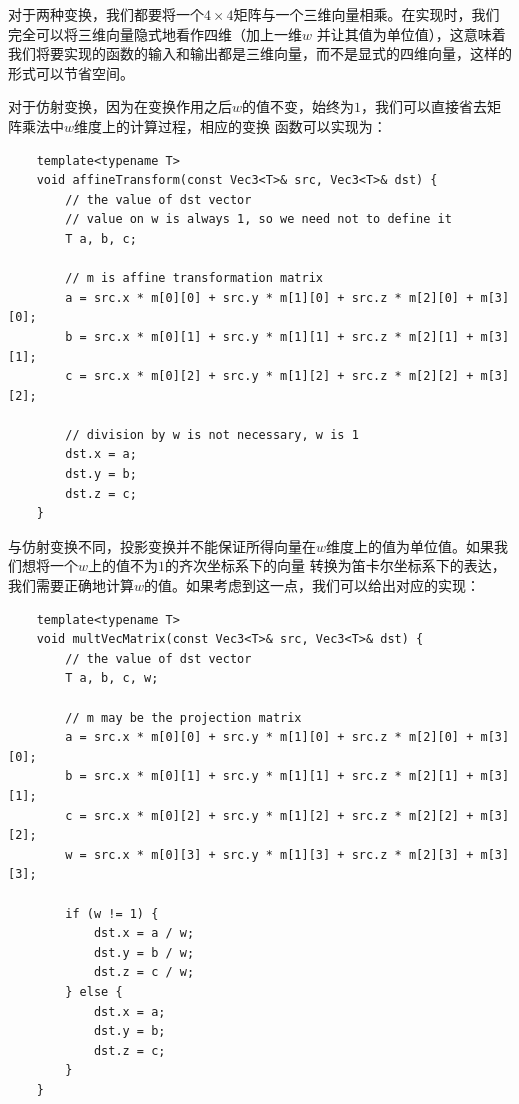\documentclass[12pt]{article}
\begin{document}
\indent{}对于两种变换，我们都要将一个$4\times 4$矩阵与一个三维向量相乘。在实现时，我们完全可以将三维向量隐式地看作四维（加上一维$w$
并让其值为单位值），这意味着我们将要实现的函数的输入和输出都是三维向量，而不是显式的四维向量，这样的形式可以节省空间。

\indent{}对于仿射变换，因为在变换作用之后$w$的值不变，始终为$1$，我们可以直接省去矩阵乘法中$w$维度上的计算过程，相应的变换
函数可以实现为：
\begin{verbatim}
    template<typename T>
    void affineTransform(const Vec3<T>& src, Vec3<T>& dst) {
        // the value of dst vector
        // value on w is always 1, so we need not to define it
        T a, b, c;

        // m is affine transformation matrix
        a = src.x * m[0][0] + src.y * m[1][0] + src.z * m[2][0] + m[3][0];
        b = src.x * m[0][1] + src.y * m[1][1] + src.z * m[2][1] + m[3][1];
        c = src.x * m[0][2] + src.y * m[1][2] + src.z * m[2][2] + m[3][2];

        // division by w is not necessary, w is 1
        dst.x = a;
        dst.y = b;
        dst.z = c;
    }
\end{verbatim}

\indent{}与仿射变换不同，投影变换并不能保证所得向量在$w$维度上的值为单位值。如果我们想将一个$w$上的值不为$1$的齐次坐标系下的向量
转换为笛卡尔坐标系下的表达，我们需要正确地计算$w$的值。如果考虑到这一点，我们可以给出对应的实现：
\begin{verbatim}
    template<typename T>
    void multVecMatrix(const Vec3<T>& src, Vec3<T>& dst) {
        // the value of dst vector
        T a, b, c, w;

        // m may be the projection matrix
        a = src.x * m[0][0] + src.y * m[1][0] + src.z * m[2][0] + m[3][0];
        b = src.x * m[0][1] + src.y * m[1][1] + src.z * m[2][1] + m[3][1];
        c = src.x * m[0][2] + src.y * m[1][2] + src.z * m[2][2] + m[3][2];
        w = src.x * m[0][3] + src.y * m[1][3] + src.z * m[2][3] + m[3][3];

        if (w != 1) {
            dst.x = a / w;
            dst.y = b / w;
            dst.z = c / w;
        } else {
            dst.x = a;
            dst.y = b;
            dst.z = c;
        }
    }
\end{verbatim}
\end{document}

